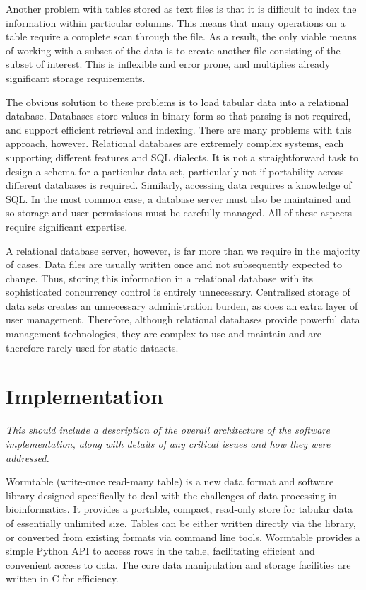 \documentclass[10pt]{bmc_article}
\newenvironment{bmcformat}{\begin{raggedright}\baselineskip20pt\sloppy\setboolean{publ}{false}}{\end{raggedright}\baselineskip20pt\sloppy}
\begin{document}
\begin{bmcformat}
Another problem with tables stored as text files is that it is difficult 
to index the information within particular columns. 
This means that many operations on a table require a complete scan 
through the file. As a result, the only viable means of 
working with a subset of the data
is to create another file consisting of the subset of interest. 
This is inflexible and error prone, and multiplies already significant  
storage requirements.

The obvious solution to these problems is to load tabular data into a
relational database. Databases store values in binary form so that parsing is 
not required, and support efficient retrieval and indexing. There 
are many problems with this approach, however. Relational databases are 
extremely complex systems, each supporting different features and SQL 
dialects. It is not a straightforward task to design a schema for a 
particular data set, particularly not if portability across different 
databases is required. Similarly, accessing data requires a knowledge
of SQL. In the most common case, a database server must also be maintained
and so storage and user permissions must be carefully managed. All of 
these aspects require significant expertise.

A relational database server, however, is far more than we require in the 
majority of cases. Data files are usually written once and 
not subsequently expected to change.
Thus, storing this information 
in a relational database with its sophisticated concurrency control
is entirely unnecessary. Centralised storage of data sets
creates an unnecessary administration burden, as does an extra
layer of user management. Therefore, although relational databases
provide powerful data management technologies, they are complex
to use and maintain and are therefore rarely used for 
static datasets.

\section*{Implementation}
\emph{This should include a description of the overall architecture of the software implementation, 
along with details of any critical issues and how they were addressed.
}

Wormtable (write-once read-many table) 
is a new data format and software library designed specifically
to deal with the challenges of data processing in bioinformatics.
It provides a portable, compact, read-only store for tabular
data of essentially unlimited size. Tables can
be either written directly via the library, or converted
from existing formats via command line tools. 
Wormtable provides a simple Python API to access rows
in the table, facilitating efficient and convenient access to 
data. The core data manipulation and storage facilities 
are written in C for efficiency.


\end{bmcformat}
\end{document}
